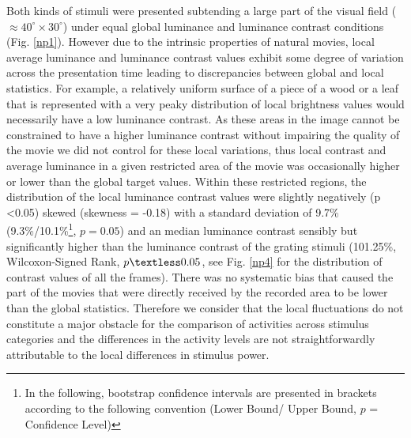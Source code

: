 Both kinds of stimuli were presented subtending a large part of the visual
field ($\approx 40^{\circ} \times 30^{\circ}$) under equal global luminance
and luminance contrast conditions (Fig. \ref{np1}). However due to the
intrinsic properties of natural movies, local average luminance and
luminance contrast values exhibit some degree of variation across the
presentation time leading to discrepancies between global and local
statistics. For example, a relatively uniform surface of a piece of a wood
or a leaf that is represented with a very peaky distribution of local
brightness values would necessarily have a low luminance contrast. As these
areas in the image cannot be constrained to have a higher luminance
contrast without impairing the quality of the movie we did not control for
these local variations, thus local contrast and average luminance in a
given restricted area of the movie was occasionally higher or lower than
the global target values. Within these restricted regions, the distribution
of the local luminance contrast values were slightly negatively (p
\textless 0.05) skewed (skewness = -0.18) with a standard deviation of
9.7\% (9.3\%/10.1\%\footnote{In the following, bootstrap confidence
intervals are presented in brackets according to the following convention
(Lower Bound/ Upper Bound, $p$ = Confidence Level)}, $p = 0.05$) and an
median luminance contrast sensibly but significantly higher than the
luminance contrast of the grating stimuli (101.25\%, Wilcoxon-Signed Rank,
$p \textless 0.05$, see Fig. \ref{np4} for the distribution of contrast
values of all the frames). There was no systematic bias that caused the
part of the movies that were directly received by the recorded area to be
lower than the global statistics. Therefore we consider that the local
fluctuations do not constitute a major obstacle for the comparison of
activities across stimulus categories and the differences in the activity
levels are not straightforwardly attributable to the local differences in
stimulus power. 

